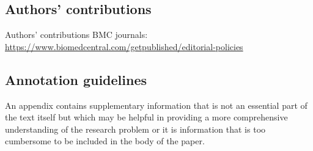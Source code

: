 \documentclass[sn-mathphys,Numbered]{sn-jnl}%
\theoremstyle{thmstyleone}%
\theoremstyle{thmstyletwo}%
\theoremstyle{thmstylethree}%
\begin{document}
\subsection*{Authors' contributions}
%
Authors' contributions
BMC journals: \url{https://www.biomedcentral.com/getpublished/editorial-policies}
%
%
%
%
\begin{appendices}
%
%
%
\section{Annotation guidelines}\label{annot_guidelines}
%
An appendix contains supplementary information that is not an essential part of the text itself but which may be helpful in providing a more comprehensive understanding of the research problem or it is information that is too cumbersome to be included in the body of the paper.
%
%
%
\end{appendices}


\end{document}
